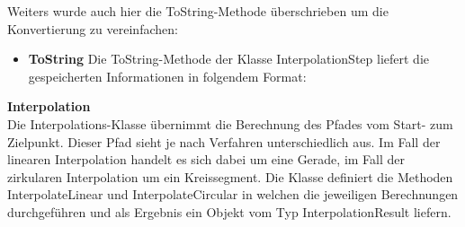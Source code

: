 Weiters wurde auch hier die ToString-Methode überschrieben um die Konvertierung zu vereinfachen:
\begin{itemize}
\item \textbf{ToString}
Die ToString-Methode der Klasse InterpolationStep liefert die gespeicherten Informationen in folgendem Format:\\
\end{itemize}

\textbf{Interpolation}\\
Die Interpolations-Klasse übernimmt die Berechnung des Pfades vom Start- zum Zielpunkt. Dieser Pfad sieht je nach Verfahren unterschiedlich aus. Im Fall der linearen Interpolation handelt es sich dabei um eine Gerade, im Fall der zirkularen Interpolation um ein Kreissegment. Die Klasse definiert die Methoden InterpolateLinear und InterpolateCircular in welchen die jeweiligen Berechnungen durchgeführen und als Ergebnis ein Objekt vom Typ InterpolationResult liefern.
